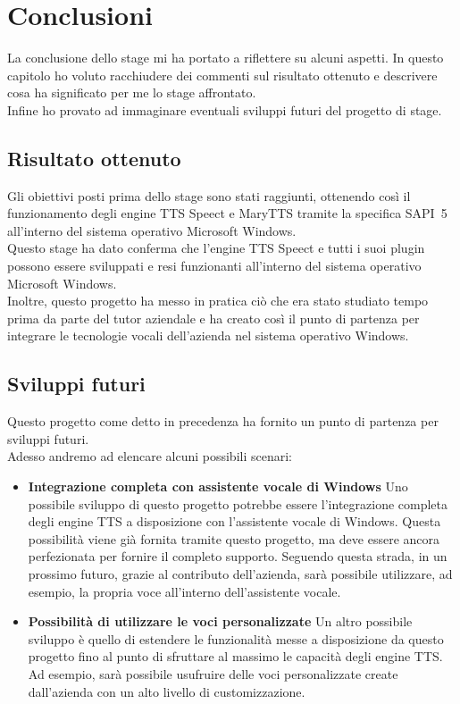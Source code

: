 \chapter{Conclusioni}
La conclusione dello stage mi ha portato a riflettere su alcuni aspetti.
In questo capitolo ho voluto racchiudere dei commenti sul risultato ottenuto e descrivere cosa ha significato per me lo stage affrontato.\\
Infine ho provato ad immaginare eventuali sviluppi futuri del progetto di stage.
\thispagestyle{empty}

\newpage

\section{Risultato ottenuto}
Gli obiettivi posti prima dello stage sono stati raggiunti, ottenendo così il funzionamento degli engine TTS Speect e MaryTTS tramite la specifica SAPI~5 all'interno del sistema operativo Microsoft Windows.\\
Questo stage ha dato conferma che l'engine TTS Speect e tutti i suoi plugin possono essere sviluppati e resi funzionanti all'interno del sistema operativo Microsoft Windows.\\
Inoltre, questo progetto ha messo in pratica ciò che era stato studiato tempo prima da parte del tutor aziendale e ha creato così il punto di partenza per integrare le tecnologie vocali dell'azienda nel sistema operativo Windows.

\section{Sviluppi futuri}
Questo progetto come detto in precedenza ha fornito un punto di partenza per sviluppi futuri.\\
Adesso andremo ad elencare alcuni possibili scenari:
\begin{itemize}
	\item \textbf{Integrazione completa con assistente vocale di Windows} Uno possibile sviluppo di questo progetto potrebbe essere l'integrazione completa degli engine TTS a disposizione con l'assistente vocale di Windows. Questa possibilità viene già fornita tramite questo progetto, ma deve essere ancora perfezionata per fornire il completo supporto.
	Seguendo questa strada, in un prossimo futuro, grazie al contributo dell'azienda, sarà possibile utilizzare, ad esempio, la propria voce all'interno dell'assistente vocale.
	\item \textbf{Possibilità di utilizzare le voci personalizzate} Un altro possibile sviluppo è quello di estendere le funzionalità messe a disposizione da questo progetto fino al punto di sfruttare al massimo le capacità degli engine TTS.
	Ad esempio, sarà possibile usufruire delle voci personalizzate create dall'azienda con un alto livello di customizzazione.
\end{itemize}

